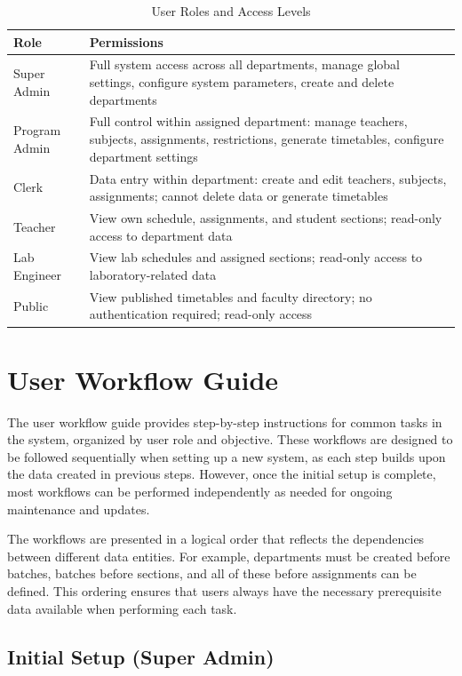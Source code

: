 \documentclass[12pt,a4paper]{article}
\begin{document}
\begin{table}[h]
\centering
\begin{tabular}{@{}lp{10cm}@{}}
\toprule
\textbf{Role} & \textbf{Permissions} \\ \midrule
Super Admin & Full system access across all departments, manage global settings, configure system parameters, create and delete departments \\
Program Admin & Full control within assigned department: manage teachers, subjects, assignments, restrictions, generate timetables, configure department settings \\
Clerk & Data entry within department: create and edit teachers, subjects, assignments; cannot delete data or generate timetables \\
Teacher & View own schedule, assignments, and student sections; read-only access to department data \\
Lab Engineer & View lab schedules and assigned sections; read-only access to laboratory-related data \\
Public & View published timetables and faculty directory; no authentication required; read-only access \\ \bottomrule
\end{tabular}
\caption{User Roles and Access Levels}
\end{table}

\section{User Workflow Guide}

The user workflow guide provides step-by-step instructions for common tasks in the system, organized by user role and objective. These workflows are designed to be followed sequentially when setting up a new system, as each step builds upon the data created in previous steps. However, once the initial setup is complete, most workflows can be performed independently as needed for ongoing maintenance and updates.

The workflows are presented in a logical order that reflects the dependencies between different data entities. For example, departments must be created before batches, batches before sections, and all of these before assignments can be defined. This ordering ensures that users always have the necessary prerequisite data available when performing each task.

\subsection{Initial Setup (Super Admin)}
\end{document}
